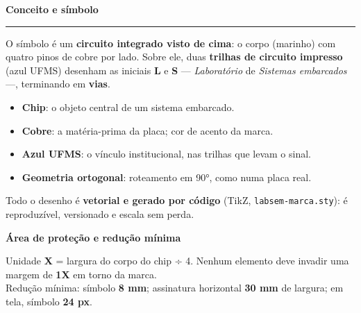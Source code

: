 \documentclass[a4paper,landscape,10pt]{article}
\newcommand{\titulo}[1]{{\color{labsemMarinho}\LARGE\bfseries #1}\par
  {\color{labsemCobre}\rule{24mm}{1.2mm}}\par\vspace{4mm}}
\begin{document}
\titulo{Conceito e símbolo}
\begin{minipage}[t]{0.46\textwidth}
O símbolo é um \textbf{circuito integrado visto de cima}: o corpo (marinho) com quatro
pinos de cobre por lado. Sobre ele, duas \textbf{trilhas de circuito impresso}
(azul UFMS) desenham as iniciais \textbf{L} e \textbf{S} --- \emph{Laboratório} de
\emph{Sistemas embarcados} ---, terminando em \textbf{vias}.

\begin{itemize}\setlength\itemsep{1pt}
  \item \textbf{Chip}: o objeto central de um sistema embarcado.
  \item \textbf{Cobre}: a matéria-prima da placa; cor de acento da marca.
  \item \textbf{Azul UFMS}: o vínculo institucional, nas trilhas que levam o sinal.
  \item \textbf{Geometria ortogonal}: roteamento em 90°, como numa placa real.
\end{itemize}

Todo o desenho é \textbf{vetorial e gerado por código} (TikZ, \texttt{labsem-marca.sty}):
é reproduzível, versionado e escala sem perda.

\vspace{4mm}
{\color{labsemMarinho}\bfseries Área de proteção e redução mínima}\par
Unidade \textbf{X} = largura do corpo do chip ÷ 4. Nenhum elemento deve invadir uma
margem de \textbf{1X} em torno da marca.\\
Redução mínima: símbolo \textbf{8 mm}; assinatura horizontal \textbf{30 mm} de largura;
em tela, símbolo \textbf{24 px}.
\end{minipage}\hfill
\begin{minipage}[t]{0.5\textwidth}
\centering
{}
\end{minipage}
\newpage
\end{document}
